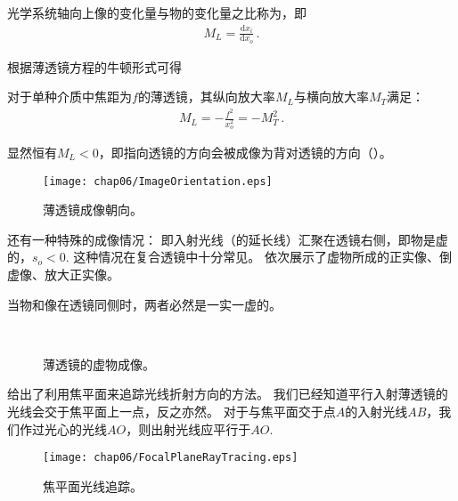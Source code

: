 \begin{definition}
    光学系统轴向上像的变化量与物的变化量之比称为，即
    \begin{align}
        M_L=\frac{\mathrm{d}x_i}{\mathrm{d}x_o}\, .
    \end{align}
\end{definition}
根据薄透镜方程的牛顿形式可得
\begin{corollary}
    对于单种介质中焦距为$f$的薄透镜，其纵向放大率$M_L$与横向放大率$M_T$满足：
    \begin{align}
        M_L=-\frac{f^2}{x_o^2}=-M_T^2\, .
    \end{align}
\end{corollary}
显然恒有$M_L<0$，即指向透镜的方向会被成像为背对透镜的方向（）。
\begin{figure}[htbp]
    \centering\texttt{[image: chap06/ImageOrientation.eps]}
    \caption{薄透镜成像朝向。}
    \label{fig:6.41}
\end{figure}

还有一种特殊的成像情况：
即入射光线（的延长线）汇聚在透镜右侧，即物是虚的，$s_o<0$.
这种情况在复合透镜中十分常见。
依次展示了虚物所成的正实像、倒虚像、放大正实像。
\begin{corollary}
    当物和像在透镜同侧时，两者必然是一实一虚的。
\end{corollary}
\begin{figure}[htbp]
    \centering
    \,
    \\
    \caption{薄透镜的虚物成像。}
    \label{fig:6.42}
\end{figure}

给出了利用焦平面来追踪光线折射方向的方法。
我们已经知道平行入射薄透镜的光线会交于焦平面上一点，反之亦然。
对于与焦平面交于点$A$的入射光线$AB$，我们作过光心的光线$AO$，则出射光线应平行于$AO$.
\begin{figure}[htbp]
    \centering\texttt{[image: chap06/FocalPlaneRayTracing.eps]}
    \caption{焦平面光线追踪。}
    \label{fig:6.43}
\end{figure}

